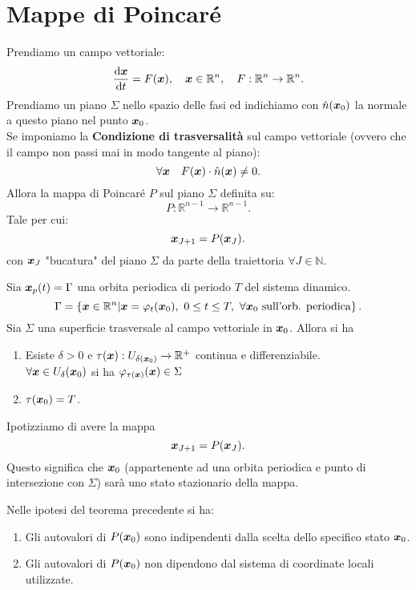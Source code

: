 \section{Mappe di Poincaré}%
Prendiamo un campo vettoriale:
\[
    \frac{\text{d} \boldsymbol{x}}{\text{d} t} = F(\boldsymbol{x}), \quad  \boldsymbol{x}\in \mathbb{R}^n, \quad  F:\mathbb{R}^n\to \mathbb{R}^n
.\] 
Prendiamo un piano $\Sigma$ nello spazio delle fasi ed indichiamo con $\hat{n}(\boldsymbol{x}_0)$ la normale a questo piano nel punto $\boldsymbol{x}_0$.\\
Se imponiamo la \textbf{Condizione di trasversalità} sul campo vettoriale (ovvero che il campo non passi mai in modo tangente al piano):
\[
    \forall \boldsymbol{x} \quad  F(\boldsymbol{x}) \cdot \hat{n}(\boldsymbol{x}) \neq 0
.\] 
Allora la mappa di Poincaré $P$ sul piano $\Sigma$ definita su:
\[
    P: \mathbb{R}^{n-1}\to \mathbb{R}^{n-1}
.\] 
Tale per cui:
\[
    \boldsymbol{x}_{J+1}= P(\boldsymbol{x}_J) 
.\] 
con $\boldsymbol{x}_J$ "bucatura" del piano $\Sigma$ da parte della traiettoria $\forall J \in \mathbb{N}$.
\begin{thm}[]
    Sia $\boldsymbol{x}_p(t) = \Gamma$ una orbita periodica di periodo $T$ del sistema dinamico. 
    \[
	\Gamma  = \left\{\boldsymbol{x}\in \mathbb{R}^n | \boldsymbol{x}= \varphi_t(\boldsymbol{x}_0), \ 0 \le t \le T, \ \forall \boldsymbol{x}_0 \text{ sull'orb. periodica}\right\}
    .\] 
    Sia $\Sigma$ una superficie trasversale al campo vettoriale in $\boldsymbol{x}_0$. Allora si ha
    \begin{enumerate}
	\item Esiste $\delta >0$ e $\tau (\boldsymbol{x}): U_{\delta (\boldsymbol{x}_0)}\to \mathbb{R}^+$ continua e differenziabile.\\
	    $\forall \boldsymbol{x}\in U_{\delta}(\boldsymbol{x}_0) $ si ha $\varphi_{\tau (\boldsymbol{x})}(\boldsymbol{x})\in \Sigma$ 
	\item $\tau(\boldsymbol{x}_0) = T$.
    \end{enumerate}
\end{thm}
\noindent
Ipotizziamo di avere la mappa 
\[
    \boldsymbol{x}_{J+1}= P(\boldsymbol{x}_J) 
.\] Questo significa che $\boldsymbol{x}_0$ (appartenente ad una orbita periodica e punto di intersezione con $\Sigma$) sarà uno stato stazionario della mappa.
\begin{thm}[]
    Nelle ipotesi del teorema precedente si ha:
    \begin{enumerate}
	\item Gli autovalori di $P(\boldsymbol{x}_0)$ sono indipendenti dalla scelta dello specifico stato $\boldsymbol{x}_0$.
	\item Gli autovalori di $P(\boldsymbol{x}_0)$ non dipendono dal sistema di coordinate locali utilizzate.
    \end{enumerate}
\end{thm}
